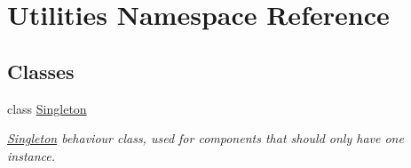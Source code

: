 \hypertarget{namespace_utilities}{}\section{Utilities Namespace Reference}
\label{namespace_utilities}
\subsection*{Classes}
\begin{DoxyCompactItemize}
\item 
class \mbox{\hyperlink{class_utilities_1_1_singleton}{Singleton}}
\begin{DoxyCompactList}\small\item\em \mbox{\hyperlink{class_utilities_1_1_singleton}{Singleton}} behaviour class, used for components that should only have one instance. \end{DoxyCompactList}\end{DoxyCompactItemize}
